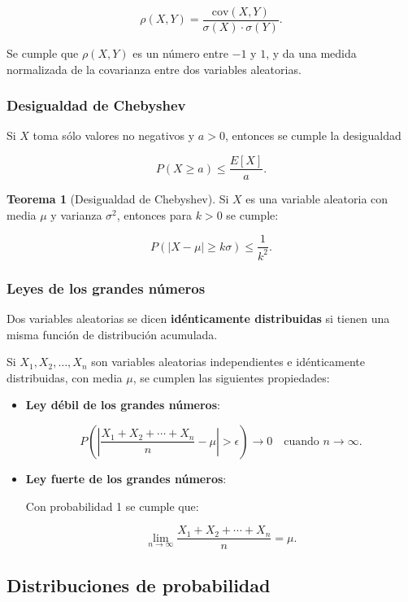 \documentclass[11pt, a4paper]{article}
\theoremstyle{definition}
\newtheorem{theorem}{Teorema}
\begin{document}
\[\rho(X,Y)=\frac{\text{cov}(X,Y)}{\sigma(X)\cdot\sigma(Y)}.\]

Se cumple que \(\rho(X,Y)\) es un número entre \(-1\) y \(1\), y da una medida normalizada de la covarianza entre dos variables aleatorias.

\subsubsection{Desigualdad de Chebyshev}
Si \( X \) toma sólo valores no negativos y \( a > 0 \), entonces se cumple la desigualdad

\[P(X \geq a) \leq \frac{E[X]}{a}. \tag{1.5}\]

\begin{theorem}[Desigualdad de Chebyshev]
Si \(X\) es una variable aleatoria con media \(\mu\) y varianza \(\sigma^{2}\), entonces para \(k>0\) se cumple:

\[P(|X-\mu|\geq k\sigma)\leq\frac{1}{k^{2}}.\]
\end{theorem}




\subsubsection{Leyes de los grandes números}
Dos variables aleatorias se dicen \textbf{idénticamente distribuidas} si tienen una misma función de distribución acumulada. 

Si \(X_{1}, X_{2}, \ldots, X_{n}\) son variables aleatorias independientes e idénticamente distribuidas, con media $\mu$, se cumplen las siguientes propiedades:

\begin{itemize}
    \item \textbf{Ley débil de los grandes números}:
    
    \[P\left(\left|\frac{X_1 + X_2 + \cdots + X_n}{n} - \mu\right| > \epsilon\right) \to 0 \quad \text{cuando } n \to \infty.\]

    \item \textbf{Ley fuerte de los grandes números}:
    
    Con probabilidad 1 se cumple que:
    
    \[\lim_{n \to \infty} \frac{X_1 + X_2 + \cdots + X_n}{n} = \mu.\]
\end{itemize}

\subsection{Distribuciones de probabilidad}
\end{document}
